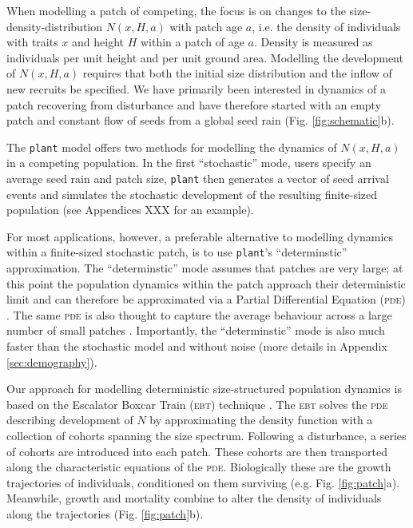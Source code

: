 \documentclass[a4paper,11pt]{article}
\newcommand{\plant}{\texttt{plant}}
\begin{document}
When modelling a patch of competing, the focus is on changes to the size-
density-distribution \(N(x, H, a)\) with patch age \(a\), i.e. the density of
individuals with traits \(x\) and height \(H\) within a patch of age \(a\).
Density is measured as individuals per unit height and per unit ground area.
Modelling the development of  \(N(x, H, a)\) requires that both the initial size
distribution and the inflow of new recruits be specified. We have primarily
been interested in dynamics of a patch recovering from disturbance and have
therefore started with an empty patch and constant flow of seeds from a global
seed rain (Fig. \ref{fig:schematic}b).

The {\plant} model offers two methods for modelling the dynamics of \(N(x,
H, a)\) in a competing population. In the first ``stochastic'' mode, users
specify an average seed rain and patch size, {\plant} then generates a
vector of seed arrival events and simulates the stochastic
development of the resulting finite-sized population (see Appendices XXX for an
example).

For most applications, however, a preferable alternative to modelling
dynamics within a finite-sized stochastic patch, is to use {\plant}'s 
``determinstic'' approximation. The ``determinstic'' mode assumes that
patches are very large; at this point the population dynamics within the
patch approach their deterministic limit and can therefore
be approximated via a Partial Differential Equation (\textsc{pde})
\citep{Deroos-1997, Kohyama-1993}.  The same \textsc{pde} is also thought to
capture the average behaviour across a large number of small patches
\citep{Moorcroft-2001}. Importantly, the ``determinstic'' mode is
also much faster than the stochastic model and without noise (more
details in Appendix \ref{sec:demography}).

Our approach for modelling deterministic size-structured population dynamics is
based on the Escalator Boxcar Train (\textsc{ebt}) technique
\citep{Deroos-1988, Deroos-1992, Deroos-1997}. The \textsc{ebt} solves
the \textsc{pde} describing development of \(N\) by approximating the
density function with a collection of cohorts spanning the size
spectrum. Following a disturbance, a series of cohorts are introduced
into each patch. These cohorts are then transported along the
characteristic equations of the \textsc{pde}. Biologically these are
the growth trajectories of individuals, conditioned on them surviving
(e.g. Fig. \ref{fig:patch}a). Meanwhile, growth and mortality combine
to alter the density of individuals along the trajectories
(Fig. \ref{fig:patch}b).
\end{document}

